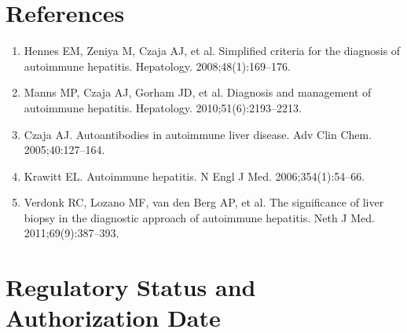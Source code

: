 \section*{References}
\begin{enumerate}
  \item Hennes EM, Zeniya M, Czaja AJ, et al. Simplified criteria for the diagnosis of autoimmune hepatitis. Hepatology. 2008;48(1):169--176.
  \item Manns MP, Czaja AJ, Gorham JD, et al. Diagnosis and management of autoimmune hepatitis. Hepatology. 2010;51(6):2193--2213.
  \item Czaja AJ. Autoantibodies in autoimmune liver disease. Adv Clin Chem. 2005;40:127--164.
  \item Krawitt EL. Autoimmune hepatitis. N Engl J Med. 2006;354(1):54--66.
  \item Verdonk RC, Lozano MF, van den Berg AP, et al. The significance of liver biopsy in the diagnostic approach of autoimmune hepatitis. Neth J Med. 2011;69(9):387--393.
\end{enumerate}

\clearpage
\section*{Regulatory Status and Authorization Date}

\clearpage
